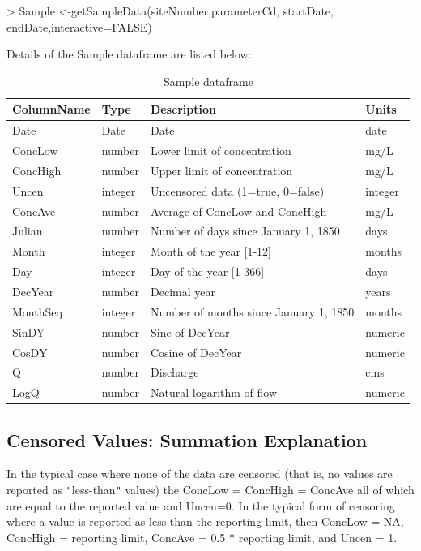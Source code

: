 \documentclass[a4paper,11pt]{article}
\begin{document}
\begin{Schunk}
\begin{Sinput}
> Sample <-getSampleData(siteNumber,parameterCd,
       startDate, endDate,interactive=FALSE)
\end{Sinput}
\end{Schunk}

Details of the Sample dataframe are listed below:

\begin{table}[!ht]
\centering
\caption{Sample dataframe} 
\begin{tabular}{llll}
  \hline
ColumnName & Type & Description & Units \\ 
  \hline
Date & Date & Date & date \\ 
  ConcLow & number & Lower limit of concentration & mg/L \\ 
  ConcHigh & number & Upper limit of concentration & mg/L \\ 
  Uncen & integer & Uncensored data (1=true, 0=false) & integer \\ 
  ConcAve & number & Average of ConcLow and ConcHigh & mg/L \\ 
  Julian & number & Number of days since January 1, 1850 & days \\ 
  Month & integer & Month of the year [1-12] & months \\ 
  Day & integer & Day of the year [1-366] & days \\ 
  DecYear & number & Decimal year & years \\ 
  MonthSeq & integer & Number of months since January 1, 1850 & months \\ 
  SinDY & number & Sine of DecYear & numeric \\ 
  CosDY & number & Cosine of DecYear & numeric \\ 
  Q \footnotemark[1] & number & Discharge & cms \\ 
  LogQ \footnotemark[1] & number & Natural logarithm of flow & numeric \\ 
   \hline
\end{tabular}
\end{table}

\FloatBarrier
\subsection{Censored Values: Summation Explanation}
In the typical case where none of the data are censored (that is, no values are reported as \texttt{"}less-than\texttt{"} values) the ConcLow = ConcHigh = ConcAve all of which are equal to the reported value and Uncen=0.  In the typical form of censoring where a value is reported as less than the reporting limit, then ConcLow = NA, ConcHigh = reporting limit, ConcAve = 0.5 * reporting limit, and Uncen = 1.
\end{document}
